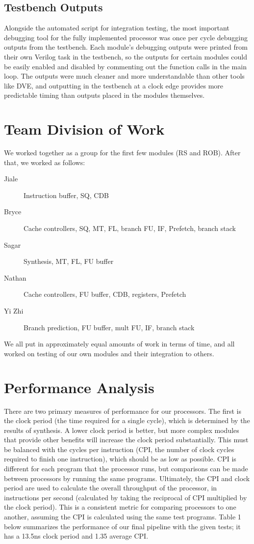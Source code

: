 \documentclass[10pt,journal,compsoc]{IEEEtran}
\begin{document}
\subsection{Testbench Outputs}
Alongside the automated script for integration testing, the most important debugging tool for the fully implemented processor was once per cycle debugging outputs from the testbench. Each module’s debugging outputs were printed from their own Verilog task in the testbench, so the outputs for certain modules could be easily enabled and disabled by commenting out the function calls in the main loop. The outputs were much cleaner and more understandable than other tools like DVE, and outputting in the testbench at a clock edge provides more predictable timing than outputs placed in the modules themselves. 

\section{Team Division of Work}
We worked together as a group for the first few modules (RS and ROB). After that, we worked as follows:
\begin{description}
\item [Jiale] Instruction buffer, SQ, CDB
\item [Bryce] Cache controllers, SQ, MT, FL, branch FU, IF, Prefetch, branch stack
\item [Sagar] Synthesis, MT, FL, FU buffer
\item [Nathan] Cache controllers, FU buffer, CDB, registers, Prefetch
\item [Yi Zhi] Branch prediction, FU buffer, mult FU, IF, branch stack

\end{description}
We all put in approximately equal amounts of work in terms of time, and all worked on testing of our own modules and their integration to others.

\section{Performance Analysis}
There are two primary measures of performance for our processors. The first is the clock period (the time required for a single cycle), which is determined by the results of synthesis. A lower clock period is better, but more complex modules that provide other benefits will increase the clock period substantially. This must be balanced with the cycles per instruction (CPI, the number of clock cycles required to finish one instruction), which should be as low as possible. CPI is different for each program that the processor runs, but comparisons can be made between processors by running the same programs. Ultimately, the CPI and clock period are used to calculate the overall throughput of the processor, in instructions per second (calculated by taking the reciprocal of CPI multiplied by the clock period). This is a consistent metric for comparing processors to one another, assuming the CPI is calculated using the same test programs. Table 1 below summarizes the performance of our final pipeline with the given tests; it has a 13.5ns clock period and 1.35 average CPI.
\end{document}
